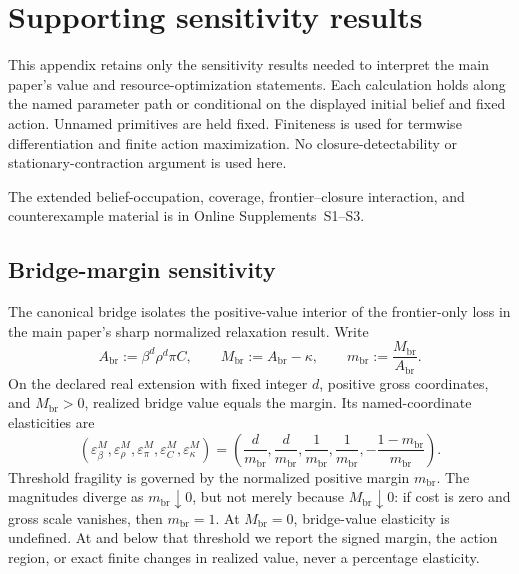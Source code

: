 \clearpage
\section{Supporting sensitivity results}\label{app:comparative-statics}

This appendix retains only the sensitivity results needed to interpret the
main paper's value and resource-optimization statements.  Each calculation
holds along the named parameter path or conditional on the displayed initial
belief and fixed action.  Unnamed primitives are held fixed.  Finiteness is
used for termwise differentiation and finite action maximization.  No
closure-detectability or stationary-contraction argument is used here.

The extended belief-occupation, coverage, frontier--closure interaction, and
counterexample material is in Online Supplements~S1--S3.

\subsection{Bridge-margin sensitivity}

The canonical bridge isolates the positive-value interior of the frontier-only
loss in the main paper's sharp normalized relaxation result.  Write
\begin{equation}\label{eq:bridge-margin}
 A_{\mathrm{br}}:=\beta^d\rho^d\pi C,
 \qquad M_{\mathrm{br}}:=A_{\mathrm{br}}-\kappa,
 \qquad m_{\mathrm{br}}:=\frac{M_{\mathrm{br}}}{A_{\mathrm{br}}}.
\end{equation}
On the declared real extension with fixed integer \(d\), positive gross
coordinates, and \(M_{\mathrm{br}}>0\), realized bridge value equals the
margin.  Its named-coordinate elasticities are
\begin{equation}
 (\varepsilon_\beta^M,\varepsilon_\rho^M,
   \varepsilon_\pi^M,\varepsilon_C^M,\varepsilon_\kappa^M)
 =\left(\frac d{m_{\mathrm{br}}},\frac d{m_{\mathrm{br}}},
   \frac1{m_{\mathrm{br}}},\frac1{m_{\mathrm{br}}},
   -\frac{1-m_{\mathrm{br}}}{m_{\mathrm{br}}}\right).
 \label{eq:bridge-elasticities}
\end{equation}
Threshold fragility is governed by the normalized positive margin
\(m_{\mathrm{br}}\).  The magnitudes diverge as
\(m_{\mathrm{br}}\downarrow0\), but not merely because
\(M_{\mathrm{br}}\downarrow0\): if cost is zero and gross scale vanishes,
then \(m_{\mathrm{br}}=1\).  At \(M_{\mathrm{br}}=0\), bridge-value
elasticity is undefined.  At and below that threshold we report the signed
margin, the action region, or exact finite changes in realized value, never a
percentage elasticity.

